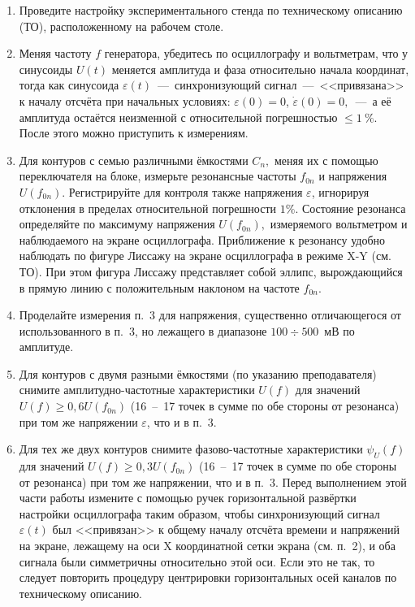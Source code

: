 \begin{lab:task}
	\begin{enumerate}
	
    \item Проведите настройку экспериментального стенда по техническому описанию (ТО), расположенному на рабочем столе.

    \item Меняя частоту $f$ генератора, убедитесь по осциллографу и вольтметрам, что у синусоиды $U(t)$ меняется амплитуда и фаза относительно начала координат, тогда как синусоида $\varepsilon(t)$~---~синхронизующий сигнал~---~<<привязана>> к началу отсчёта при начальных условиях: $\varepsilon(0)=0$, $\dot{\varepsilon}(0)=0,$~---~а её амплитуда остаётся неизменной с относительной погрешностью  $\le1~\%$. После этого можно приступить к измерениям.

    \item Для контуров с семью различными ёмкостями $C_n,$ меняя их с помощью переключателя на блоке, измерьте резонансные частоты $f_{0n}$ и напряжения $U(f_{0n}).$ Регистрируйте для контроля также напряжения $\varepsilon$, игнорируя отклонения в пределах относительной погрешности $1\%$. Состояние резонанса определяйте по максимуму напряжения $U(f_{0n}),$ измеряемого вольтметром и наблюдаемого на экране осциллографа. Приближение к резонансу удобно наблюдать по фигуре Лиссажу на экране осциллографа в режиме X-Y (см. ТО). При этом фигура Лиссажу представляет собой эллипс, вырождающийся в прямую линию с положительным наклоном  на частоте $f_{0n}.$

    \item {} Проделайте измерения п.~3 для напряжения, существенно отличающегося от использованного в п.~3, но лежащего в диапазоне $100\div500$~мВ по амплитуде.

    \item Для контуров с двумя разными ёмкостями (по указанию преподавателя) снимите амплитудно-частотные характеристики $U(f)$ для значений $U(f)\ge0,6U(f_{0n})$ (16~--~17 точек в сумме по обе стороны от резонанса) при том же напряжении $\varepsilon$, что и в п.~3.

    \item Для тех же двух контуров снимите фазово-частотные характеристики $\psi_U(f)$ для значений $U(f)\ge0,3U(f_{0n})$ (16~--~17 точек в сумме по обе стороны от резонанса) при том же напряжении, что и в п.~3. Перед выполнением этой части работы измените с помощью ручек горизонтальной развёртки настройки осциллографа таким образом, чтобы синхронизующий сигнал $\varepsilon(t)$ был <<привязан>> к общему началу отсчёта времени и напряжений на экране, лежащему на оси X координатной сетки экрана (см. п.~2), и оба сигнала были симметричны относительно этой оси. Если это не так, то следует повторить процедуру центрировки горизонтальных осей каналов по техническому описанию.


\end{enumerate}
\end{lab:task}
